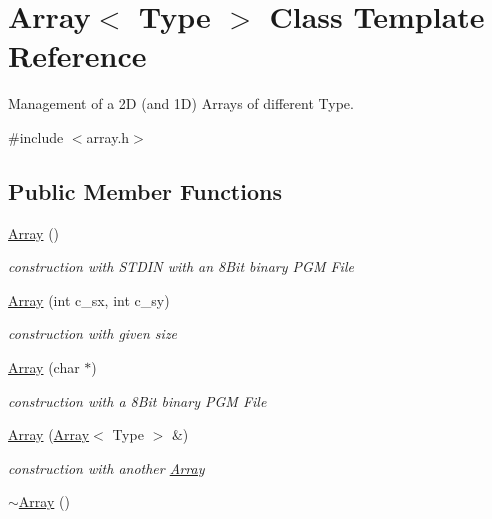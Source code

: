 \hypertarget{classArray}{}\section{Array$<$ Type $>$ Class Template Reference}
\label{classArray}


Management of a 2D (and 1D) Arrays of different Type.  




{\ttfamily \#include $<$array.\+h$>$}

\subsection*{Public Member Functions}
\begin{DoxyCompactItemize}
\item 
\hyperlink{classArray_aab6b745706965870b8dc792a3548c08a}{Array} ()\hypertarget{classArray_aab6b745706965870b8dc792a3548c08a}{}\label{classArray_aab6b745706965870b8dc792a3548c08a}

\begin{DoxyCompactList}\small\item\em construction with S\+T\+D\+IN with an 8\+Bit binary P\+GM File \end{DoxyCompactList}\item 
\hyperlink{classArray_acc6e46777c942b641f6161e886ee8081}{Array} (int c\+\_\+sx, int c\+\_\+sy)
\begin{DoxyCompactList}\small\item\em construction with given size \end{DoxyCompactList}\item 
\hyperlink{classArray_a6274021517cb79fdb76c5f8f56c1d844}{Array} (char $\ast$)
\begin{DoxyCompactList}\small\item\em construction with a 8\+Bit binary P\+GM File \end{DoxyCompactList}\item 
\hyperlink{classArray_a07e3948a01b88fab831944214c497769}{Array} (\hyperlink{classArray}{Array}$<$ Type $>$ \&)
\begin{DoxyCompactList}\small\item\em construction with another \hyperlink{classArray}{Array} \end{DoxyCompactList}\item 
\hyperlink{classArray_acea4f44bbc891745b92b19ceca891746}{$\sim$\+Array} ()\hypertarget{classArray_acea4f44bbc891745b92b19ceca891746}{}\label{classArray_acea4f44bbc891745b92b19ceca891746}


\end{DoxyCompactItemize}

